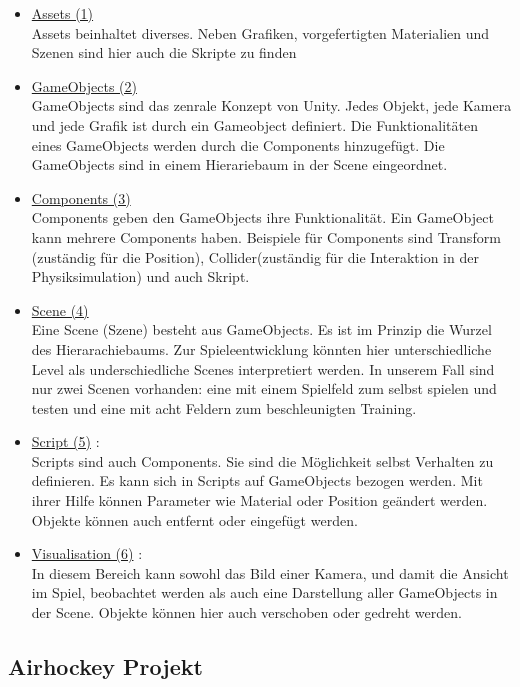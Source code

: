 \begin{itemize}
\item \underline{Assets (1)} \\
Assets beinhaltet diverses. Neben Grafiken, vorgefertigten Materialien und Szenen sind hier auch die Skripte zu finden

\item \underline{GameObjects (2)} \\
GameObjects sind das zenrale Konzept von Unity. Jedes Objekt, jede Kamera und jede Grafik ist durch ein Gameobject definiert. Die Funktionalitäten eines GameObjects werden durch die Components hinzugefügt. Die GameObjects sind in einem Hierariebaum in der Scene  eingeordnet.

\item \underline{Components (3)} \\
Components geben den GameObjects ihre Funktionalität. Ein GameObject kann mehrere Components haben. Beispiele für Components sind Transform (zuständig für die Position), Collider(zuständig für die Interaktion in der Physiksimulation) und auch Skript.

\item \underline{Scene (4)} \\
Eine Scene (Szene) besteht aus GameObjects. Es ist im Prinzip die Wurzel des Hierarachiebaums. Zur Spieleentwicklung könnten hier unterschiedliche Level als underschiedliche Scenes interpretiert werden. In unserem Fall sind nur zwei Scenen vorhanden: eine mit einem Spielfeld zum selbst spielen und testen und eine mit acht Feldern zum beschleunigten Training.

\item \underline{Script (5)} :\\
Scripts sind auch Components. Sie sind die Möglichkeit selbst Verhalten zu definieren. Es kann sich in Scripts auf GameObjects bezogen werden. Mit ihrer Hilfe können Parameter wie Material oder Position geändert werden. Objekte können auch entfernt oder eingefügt werden.

\item \underline{Visualisation (6)} :\\
In diesem Bereich kann sowohl das Bild einer Kamera, und  damit die Ansicht im Spiel, beobachtet werden als auch eine Darstellung aller GameObjects in der Scene. Objekte können hier auch verschoben oder gedreht werden.
\end{itemize}

\subsection{Airhockey Projekt}
\label{subsect:Airhockey Projekt}

